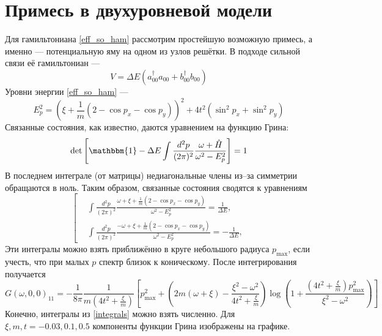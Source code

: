 \section{Примесь в двухуровневой модели}
Для гамильтониана \eqref{eff_so_ham} рассмотрим простейшую возможную примесь, а именно ---
потенциальную яму на одном из узлов решётки. В подходе сильной связи её гамильтониан ---
\begin{equation}
    V = \Delta E (a_{00}^\dagger a_{00} + b_{00}^\dagger b_{00})
\end{equation}
Уровни энергии \eqref{eff_so_ham} --- 
\begin{equation}
    E_p^2 = (\xi + \frac{1}{m}(2 - \cos{p_x} - \cos{p_y}))^2 + 4t^2(\sin^2{p_x} + \sin^2{p_y})
\end{equation}
Связанные состояния, как известно, даются уравнением на функцию Грина:
\begin{equation}    
    \det{\left[\mathbbm{1} - \Delta E \int \frac{d^2 p}{(2\pi)^2} 
            \frac{\omega + \hat{H}}{\omega^2 - E_p^2}\right]} = 1
\end{equation}
В последнем интеграле (от матрицы) недиагональные члены из--за симметрии обращаются в ноль.
Таким образом, связанные состояния сводятся к уравнениям
\begin{equation}
    \label{integrals}
    \left[
    \begin{split}
        &\int \frac{d^2 p}{(2\pi)^2} 
            \frac{\omega + \xi + \frac{1}{m}(2 - \cos{p_x} - \cos{p_y})}
                 {\omega^2 - E_p^2} = \frac{1}{\Delta E},\\
        &\int \frac{d^2 p}{(2\pi)^2} 
            \frac{-\omega + \xi + \frac{1}{m}(2 - \cos{p_x} - \cos{p_y})}
                 {\omega^2 - E_p^2} = -\frac{1}{\Delta E},
    \end{split}
    \right.
\end{equation}
Эти интегралы можно взять приближённо в круге небольшого радиуса $p_{\mathrm{max}}$,
если учесть, что при малых $p$ спектр близок к 
коническому. После интегрирования получается
\begin{equation}
    G(\omega,0,0)_{11} = -\frac{1}{8\pi}\frac{1}{m(4t^2 + \frac{\xi}{m})}
        \left[ p_{\mathrm{max}}^2 + 
            \left(2m(\omega+\xi) - \frac{\xi^2 - \omega^2}{4t^2 + \frac{\xi}{m}}\right) 
                \log{\left(1 + \frac{\left(4t^2 + \frac{\xi}{m}\right)p_{\mathrm{max}}^2}
                                    {\xi^2 - \omega^2}\right)}\right]
\end{equation}
Конечно, интегралы из \eqref{integrals} можно взять численно. Для 
$\xi, m, t = -0.03, 0.1, 0.5$ компоненты функции Грина изображены на графике.

